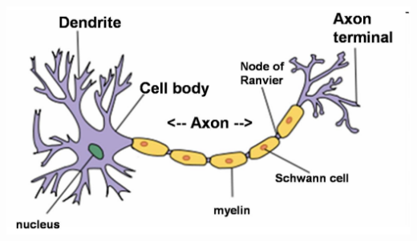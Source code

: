 \documentclass[11pt]{article}
\begin{document}
\begin{center}
\includegraphics[width=.9\linewidth]{book/AfmsJ_2016-10-25_20-22-30.jpg}
\end{center}
\end{document}
